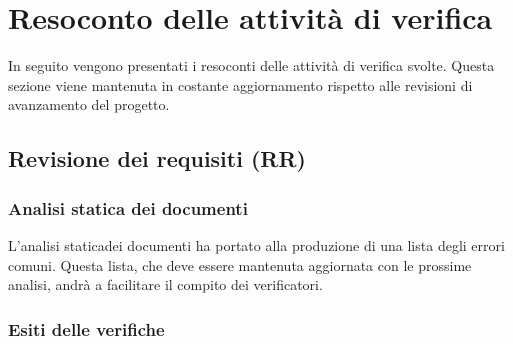 \section{Resoconto delle attività di verifica}
In seguito vengono presentati i resoconti delle attività di verifica svolte.
Questa sezione viene mantenuta in costante aggiornamento rispetto alle revisioni di avanzamento del progetto\glo.
\subsection{Revisione dei requisiti (RR)}
\subsubsection{Analisi statica dei documenti}
L'analisi statica\glosp dei documenti ha portato alla produzione di una lista degli errori comuni. Questa lista, che deve essere mantenuta aggiornata con le prossime analisi, andrà a facilitare il compito dei verificatori.
\subsubsection{Esiti delle verifiche}
